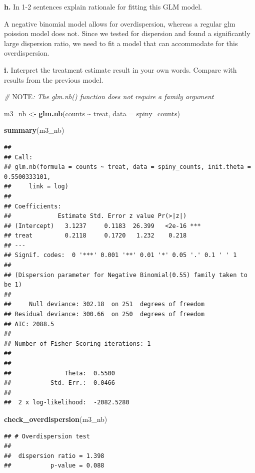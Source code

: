\documentclass[
]{article}
\newenvironment{Shaded}{\begin{snugshade}}{\end{snugshade}}
\newcommand{\AlertTok}[1]{\textcolor[rgb]{0.94,0.16,0.16}{#1}}
\newcommand{\AttributeTok}[1]{\textcolor[rgb]{0.13,0.29,0.53}{#1}}
\newcommand{\CommentTok}[1]{\textcolor[rgb]{0.56,0.35,0.01}{\textit{#1}}}
\newcommand{\FunctionTok}[1]{\textcolor[rgb]{0.13,0.29,0.53}{\textbf{#1}}}
\newcommand{\NormalTok}[1]{#1}
\newcommand{\OtherTok}[1]{\textcolor[rgb]{0.56,0.35,0.01}{#1}}
\newcommand{\SpecialCharTok}[1]{\textcolor[rgb]{0.81,0.36,0.00}{\textbf{#1}}}
\begin{document}
\textbf{h.} In 1-2 sentences explain rationale for fitting this GLM
model.

A negative binomial model allows for overdispersion, whereas a regular
glm poission model does not. Since we tested for dispersion and found a
significantly large dispersion ratio, we need to fit a model that can
accommodate for this overdispersion.

\textbf{i.} Interpret the treatment estimate result in your own words.
Compare with results from the previous model.

\begin{Shaded}
\begin{Highlighting}[]
\CommentTok{\# }\AlertTok{NOTE}\CommentTok{: The \textasciigrave{}glm.nb()\textasciigrave{} function does not require a \textasciigrave{}family\textasciigrave{} argument}

\NormalTok{m3\_nb }\OtherTok{\textless{}{-}} \FunctionTok{glm.nb}\NormalTok{(counts }\SpecialCharTok{\textasciitilde{}}\NormalTok{ treat,}
                \AttributeTok{data =}\NormalTok{ spiny\_counts)}

\FunctionTok{summary}\NormalTok{(m3\_nb)}
\end{Highlighting}
\end{Shaded}

\begin{verbatim}
## 
## Call:
## glm.nb(formula = counts ~ treat, data = spiny_counts, init.theta = 0.5500333101, 
##     link = log)
## 
## Coefficients:
##             Estimate Std. Error z value Pr(>|z|)    
## (Intercept)   3.1237     0.1183  26.399   <2e-16 ***
## treat         0.2118     0.1720   1.232    0.218    
## ---
## Signif. codes:  0 '***' 0.001 '**' 0.01 '*' 0.05 '.' 0.1 ' ' 1
## 
## (Dispersion parameter for Negative Binomial(0.55) family taken to be 1)
## 
##     Null deviance: 302.18  on 251  degrees of freedom
## Residual deviance: 300.66  on 250  degrees of freedom
## AIC: 2088.5
## 
## Number of Fisher Scoring iterations: 1
## 
## 
##               Theta:  0.5500 
##           Std. Err.:  0.0466 
## 
##  2 x log-likelihood:  -2082.5280
\end{verbatim}

\begin{Shaded}
\begin{Highlighting}[]
\FunctionTok{check\_overdispersion}\NormalTok{(m3\_nb)}
\end{Highlighting}
\end{Shaded}

\begin{verbatim}
## # Overdispersion test
## 
##  dispersion ratio = 1.398
##           p-value = 0.088
\end{verbatim}
\end{document}
